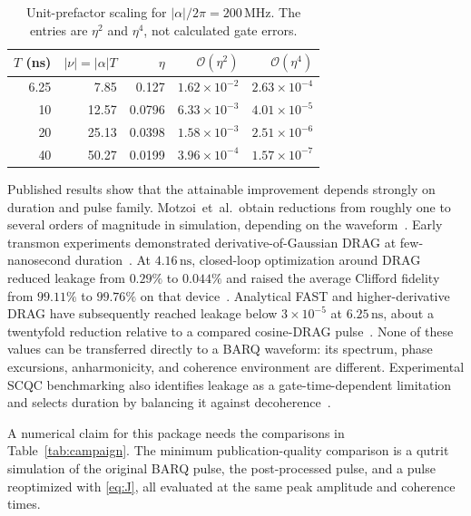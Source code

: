 \documentclass[11pt,a4paper]{article}
\theoremstyle{definition}
\newcommand{\abs}[1]{\lvert #1\rvert}
\newcommand{\order}{\mathcal{O}}
\begin{document}
\begin{table}[ht]
\centering
\caption{Unit-prefactor scaling for \(\abs\alpha/2\pi=200\,\mathrm{MHz}\).
The entries are \(\eta^2\) and \(\eta^4\), not calculated gate errors.}
\label{tab:scaling}
\begin{tabular}{@{}rrrrr@{}}
\toprule
\(T\) (ns) & \(\abs\nu=\abs\alpha T\) & \(\eta\) & \(\order(\eta^2)\) &
\(\order(\eta^4)\) \\
\midrule
6.25 & 7.85 & 0.127 & \(1.62\times10^{-2}\) & \(2.63\times10^{-4}\) \\
10 & 12.57 & 0.0796 & \(6.33\times10^{-3}\) & \(4.01\times10^{-5}\) \\
20 & 25.13 & 0.0398 & \(1.58\times10^{-3}\) & \(2.51\times10^{-6}\) \\
40 & 50.27 & 0.0199 & \(3.96\times10^{-4}\) & \(1.57\times10^{-7}\) \\
\bottomrule
\end{tabular}
\end{table}

Published results show that the attainable improvement depends strongly on
duration and pulse family.  Motzoi~et~al.\ obtain reductions from roughly one
to several orders of magnitude in simulation, depending on the
waveform~\cite{Motzoi2009}.  Early transmon experiments demonstrated
derivative-of-Gaussian DRAG at few-nanosecond
duration~\cite{Chow2010}.  At \(4.16\,\mathrm{ns}\), closed-loop optimization
around DRAG reduced leakage from \(0.29\%\) to \(0.044\%\) and raised the
average Clifford fidelity from \(99.11\%\) to \(99.76\%\) on that
device~\cite{Werninghaus2021}.  Analytical FAST and higher-derivative DRAG
have subsequently reached leakage below \(3\times10^{-5}\) at
\(6.25\,\mathrm{ns}\), about a twentyfold reduction relative to a compared
cosine-DRAG pulse~\cite{Hyyppa2024}.  None of these values can be transferred
directly to a BARQ waveform: its spectrum, phase excursions, anharmonicity, and
coherence environment are different.  Experimental SCQC benchmarking also
identifies leakage as a gate-time-dependent limitation and selects duration by
balancing it against decoherence~\cite{SCQCExperiment2025}.

A numerical claim for this package needs the comparisons in
Table~\ref{tab:campaign}.  The minimum publication-quality comparison is a
qutrit simulation of the original BARQ pulse, the post-processed pulse, and a
pulse reoptimized with \eqref{eq:J}, all evaluated at the same peak amplitude
and coherence times.
\end{document}
